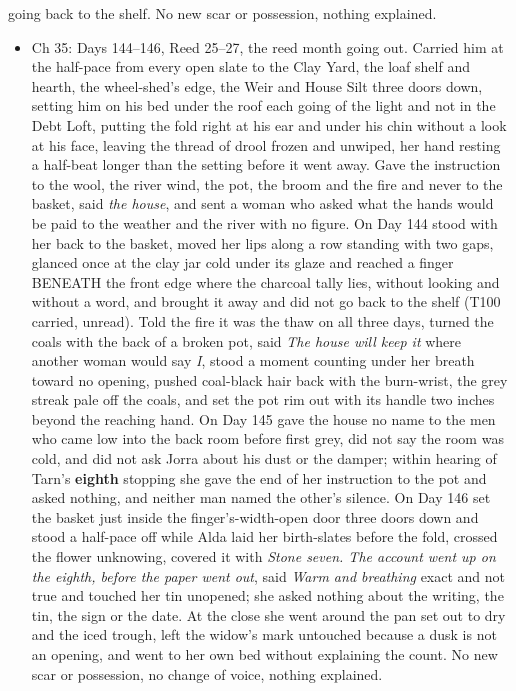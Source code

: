 \documentclass{design/chronicle}
\begin{document}
{\begin{itemize}[leftmargin=1.4em,itemsep=1pt,topsep=3pt,parsep=0pt]
going back to the shelf. No new scar or possession, nothing explained.

\end{itemize}

\begin{itemize}[leftmargin=1.4em,itemsep=1pt,topsep=3pt,parsep=0pt]

\item Ch 35: Days 144–146, Reed 25–27, the reed month going out. Carried him at the half-pace from every open slate to the Clay Yard, the loaf shelf and hearth, the wheel-shed’s edge, the Weir and House Silt three doors down, setting him on his bed under the roof each going of the light and not in the Debt Loft, putting the fold right at his ear and under his chin without a look at his face, leaving the thread of drool frozen and unwiped, her hand resting a half-beat longer than the setting before it went away. Gave the instruction to the wool, the river wind, the pot, the broom and the fire and never to the basket, said \emph{the house}, and sent a woman who asked what the hands would be paid to the weather and the river with no figure. On Day 144 stood with her back to the basket, moved her lips along a row standing with two gaps, glanced once at the clay jar cold under its glaze and reached a finger BENEATH the front edge where the charcoal tally lies, without looking and without a word, and brought it away and did not go back to the shelf (T100 carried, unread). Told the fire it was the thaw on all three days, turned the coals with the back of a broken pot, said \emph{The house will keep it} where another woman would say \emph{I}, stood a moment counting under her breath toward no opening, pushed coal-black hair back with the burn-wrist, the grey streak pale off the coals, and set the pot rim out with its handle two inches beyond the reaching hand. On Day 145 gave the house no name to the men who came low into the back room before first grey, did not say the room was cold, and did not ask Jorra about his dust or the damper; within hearing of Tarn’s \textbf{eighth} stopping she gave the end of her instruction to the pot and asked nothing, and neither man named the other’s silence. On Day 146 set the basket just inside the finger’s-width-open door three doors down and stood a half-pace off while Alda laid her birth-slates before the fold, crossed the flower unknowing, covered it with \emph{Stone seven. The account went up on the eighth, before the paper went out}, said \emph{Warm and breathing} exact and not true and touched her tin unopened; she asked nothing about the writing, the tin, the sign or the date. At the close she went around the pan set out to dry and the iced trough, left the widow’s mark untouched because a dusk is not an opening, and went to her own bed without explaining the count. No new scar or possession, no change of voice, nothing explained.


\end{itemize}}
\end{document}
